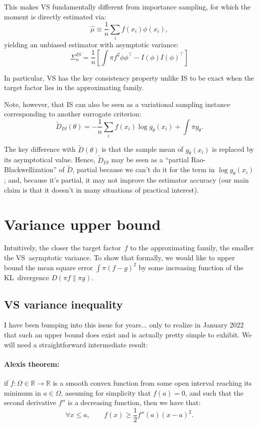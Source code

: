 \documentclass{article}
\begin{document}
This makes VS fundamentally different from importance sampling, for which the moment is directly estimated via:
$$
\hat{\mu} \equiv \frac{1}{n} \sum_i f(x_i)\phi(x_i),
$$
yielding an unbiased estimator with asymptotic variance:
$$
\Sigma_n^{IS} = \frac{1}{n} \left[
\int \pi f^2 \phi \phi^\top
- I(\phi) I(\phi)^\top
\right]
$$

In particular, VS has the key consistency property unlike IS to be exact when the target factor lies in the approximating family.

Note, however, that IS can also be seen as a variational sampling instance corresponding to another surrogate criterion:
$$
\tilde{D}_{IS}(\theta)
= - \frac{1}{n} \sum_i f(x_i) \log g_\theta(x_i) 
  + \int \pi g_\theta
.
$$

The key difference with $\tilde{D}(\theta)$ is that the sample mean of $g_\theta(x_i)$ is replaced by its asymptotical value. Hence, $\tilde{D}_{IS}$ may be seen as a ``partial Rao-Blackwellization'' of $\tilde{D}$, partial because we can't do it for the term in $\log g_\theta(x_i)$; and, because it's partial, it may not improve the estimator accuracy (our main claim is that it doesn't in many situations of practical interest).



\section{Variance upper bound}

Intuitively, the closer the target factor~$f$ to the approximating family, the smaller the VS~asymptotic variance. To show that formally, we would like to upper bound the mean square error $\int\pi(f-g)^2$ by some increasing function of the KL~divergence $D(\pi f\|\pi g)$. 

\subsection{VS variance inequality}

I have been bumping into this issue for years... only to realize in January 2022 that such an upper bound does exist and is actually pretty simple to exhibit. We will need a straightforward intermediate result:

\paragraph{Alexis theorem:} if $f:\Omega\in\mathbb{R}\to \mathbb{R}$ is a smooth convex function from some open interval reaching its minimum in $a\in\Omega$, assuming for simplicity that $f(a)=0$, and such that the second derivative $f''$ is a decreasing function, then we have that:
$$
\forall x \leq a,
\qquad
f(x) \geq \frac{1}{2} f''(a) (x - a)^2 .
$$
\end{document}
